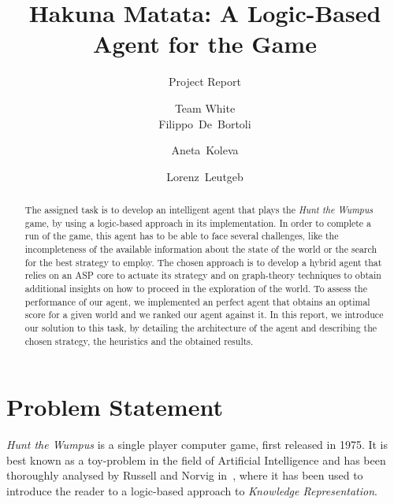 \documentclass{llncs}
\title{Hakuna Matata: A Logic-Based Agent for the \htw Game}
\subtitle{Project Report}
\author{Team White\\[2mm]Filippo~De~Bortoli \and Aneta~Koleva \and Lorenz~Leutgeb}
\institute{Free University of Bozen-Bolzano\\[3mm] \texttt{\{\href{mailto:filippo.debortoli@stud-inf.unibz.it}{filippo.debortoli},\href{mailto:aneta.koleva@stud-inf.unibz.it}{aneta.koleva},\href{mailto:lorenz.leutgeb@stud-inf.unibz.it}{lorenz.leutgeb}\}\newline @stud-inf.unibz.it}}
\newcommand{\htw}{\emph{Hunt the Wumpus }}
\begin{document}
\maketitle
\thispagestyle{plain}

\begin{abstract}
  The assigned task is to develop an intelligent agent that plays the \htw game, by using a logic-based approach in its implementation.
  In order to complete a run of the game, this agent has to be able to face several challenges, like the incompleteness of the available information about the state of the world or the search for the best strategy to employ.
  The chosen approach is to develop a hybrid agent that relies on an ASP core to actuate its strategy and on graph-theory techniques to obtain additional insights on how to proceed in the exploration of the world.
  To assess the performance of our agent, we implemented an perfect agent that obtains an optimal score for a given world and we ranked our agent against it.
  In this report, we introduce our solution to this task, by detailing the architecture of the agent and describing the chosen strategy, the heuristics and the obtained results.
\end{abstract}

\section{Problem Statement}

\htw is a single player computer game, first released in 1975.
It is best known as a toy-problem in the field of Artificial Intelligence and has been thoroughly analysed by Russell and Norvig in~\cite{book:aima}, where it has been used to introduce the reader to a logic-based approach to \emph{Knowledge Representation}.
\end{document}
